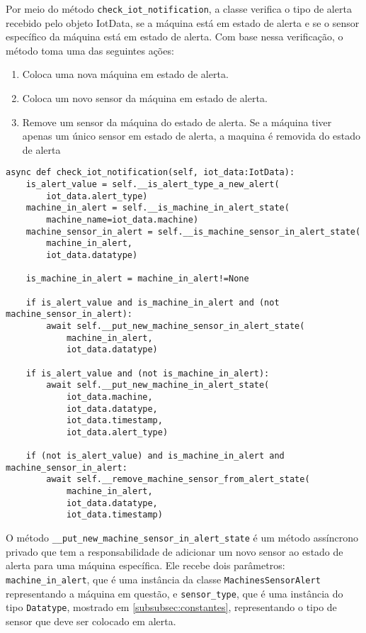 Por meio do método \texttt{check\_iot\_notification}, a classe verifica o tipo de alerta recebido pelo objeto IotData, se a máquina está em estado de alerta e se o sensor específico da máquina está em estado de alerta. Com base nessa verificação, o método toma uma das seguintes ações:

\begin{enumerate}
    \item Coloca uma nova máquina em estado de alerta.
    \item Coloca um novo sensor da máquina em estado de alerta.
    \item Remove um sensor da máquina do estado de alerta. Se a máquina tiver apenas um único sensor em estado de alerta, a maquina é removida do estado de alerta
\end{enumerate}


\begin{verbatim}
async def check_iot_notification(self, iot_data:IotData):
    is_alert_value = self.__is_alert_type_a_new_alert(
        iot_data.alert_type)
    machine_in_alert = self.__is_machine_in_alert_state(
        machine_name=iot_data.machine)
    machine_sensor_in_alert = self.__is_machine_sensor_in_alert_state(
        machine_in_alert,
        iot_data.datatype)

    is_machine_in_alert = machine_in_alert!=None

    if is_alert_value and is_machine_in_alert and (not machine_sensor_in_alert):
        await self.__put_new_machine_sensor_in_alert_state(
            machine_in_alert,
            iot_data.datatype)

    if is_alert_value and (not is_machine_in_alert):
        await self.__put_new_machine_in_alert_state(
            iot_data.machine,
            iot_data.datatype,
            iot_data.timestamp,
            iot_data.alert_type)

    if (not is_alert_value) and is_machine_in_alert and machine_sensor_in_alert:
        await self.__remove_machine_sensor_from_alert_state(
            machine_in_alert,
            iot_data.datatype,
            iot_data.timestamp)
\end{verbatim}

O método \texttt{\_\_put\_new\_machine\_sensor\_in\_alert\_state} é um método assíncrono privado que tem a responsabilidade de adicionar um novo sensor ao estado de alerta para uma máquina específica. Ele recebe dois parâmetros: \texttt{machine\_in\_alert}, que é uma instância da classe \texttt{MachinesSensorAlert} representando a máquina em questão, e \texttt{sensor\_type}, que é uma instância do tipo \texttt{Datatype}, mostrado em \ref{subsubsec:constantes}, representando o tipo de sensor que deve ser colocado em alerta.

